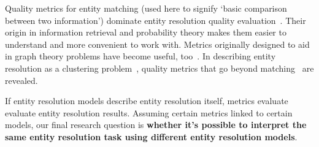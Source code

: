 Quality metrics for entity matching (used here to signify `basic comparison
between two information') dominate entity resolution quality
evaluation~\cite{fever2009,Men10,Goga2015}.
Their origin in information retrieval and probability theory makes them easier
to understand and more convenient to work with.
Metrics originally designed to aid in graph theory problems have become useful,
too~\cite{hitesh2012,Kon19}.
In describing entity resolution as a clustering problem~\cite{Tal11}, quality
metrics that go beyond matching~\cite{Men10,tal2007algebraic} are revealed.

If entity resolution models describe entity resolution itself, metrics evaluate
evaluate entity resolution results.
Assuming certain metrics linked to certain models, our final research question
is \textbf{whether it's possible to interpret the same entity resolution task
using different entity resolution models}.
